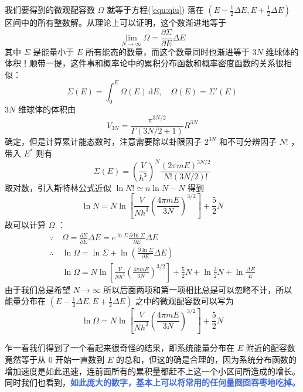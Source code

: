 \documentclass[hyperref,UTF-8]{ctexart}
\newcommand{\0}{\boldsymbol{0}}
\begin{document}
我们要得到的微观配容数 $\Omega$ 就等于方程(\ref*{equ:qiu}) 落在 $(E-\frac{1}{2} \Delta E ,E+\frac{1}{2} \Delta E)$ 区间中的所有整数解。从理论上可以证明，这个数渐进地等于
\begin{equation}\label{equ:lim}
    \lim_{N\rightarrow \infty}\Omega = \frac{\partial \Sigma}{\partial E}\Delta E
\end{equation}
其中 $\Sigma$ 是能量小于 $E$ 所有能态的数量，而这个数量同时也渐进等于 $3N$ 维球体的体积！顺带一提，这件事和概率论中的累积分布函数和概率密度函数的关系很相似：
\[
    \Sigma(E) = \int_{0}^{E}\Omega(E)\,\mathrm dE,\quad \Omega(E) = \Sigma'(E)
\]
 $3N$ 维球体的体积由
\begin{equation}
    V_{3 N}=\frac{\pi^{3 N / 2}}{\Gamma(3 N / 2+1)} R^{3 N}
\end{equation}
确定，但是计算累计能态数时，注意需要除以卦限因子 $2^{3N}$ 和不可分辨因子 $N!$ ，带入 $E^*$ 则有
\begin{equation}
    \Sigma(E)= \left(\frac{V}{h^3} \right)^N \frac{(2\pi mE)^{3N/2}}{N!(3N/2)!} 
\end{equation}
取对数，引入斯特林公式近似 $\ln N! \simeq n\ln N - N$ 得到
\begin{equation}\label{equ:lnN}
    \ln N = N \ln\left[ \frac{V}{N h^3} \left(\frac{4\pi mE}{3N} \right)^{3/2}  \right] + \frac{5}{2} N
\end{equation}
故可以计算 $\Omega$ ：
\begin{align*}
    \because ~& \Omega = \frac{\partial \Sigma}{\partial E}\Delta E = e^{\ln \Sigma} \frac{\partial \ln\Sigma}{\partial E}\Delta E \\
    \therefore~& \ln \Omega = \ln \Sigma + \ln\left(\frac{\partial \ln\Sigma}{\partial E}\Delta E\right) \\
    ~& \ln \Omega = N \ln\left[ \frac{V}{N h^3} \left(\frac{4\pi mE}{3N} \right)^{3/2}  \right] + \frac{5}{2} N + \ln \frac{3}{2} N +\ln \frac{\Delta E}{E} 
\end{align*}
由于我们总是希望 $N\rightarrow \infty$ 所以后面两项和第一项相比总是可以忽略不计，所以能量分布在 $(E-\frac{1}{2} \Delta E ,E+\frac{1}{2} \Delta E)$ 之中的微观配容数可以写为
\begin{equation}
    \ln \Omega = N \ln\left[ \frac{V}{N h^3} \left(\frac{4\pi mE}{3N} \right)^{3/2}  \right] + \frac{5}{2} N 
\end{equation}

乍一看我们得到了一个看起来很奇怪的结果，即系统能量分布在 $E$ 附近的配容数竟然等于从 $0$ 开始一直数到 $E$ 的总和，但这的确是合理的，因为系统分布函数的增加速度是如此迅速，连前面所有的累积量都赶不上这一个小区间所造成的增长。同时我们也看到，\textcolor{RoyalBlue}{\textbf{\kaishu 如此庞大的数字，基本上可以将常用的任何量囫囵吞枣地吃掉。}} 
\end{document}
